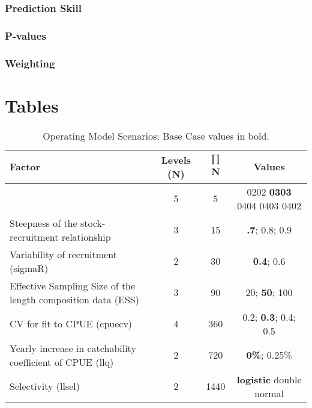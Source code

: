 \documentclass[a4paper]{article}
\begin{document}
\subsubsection*{Prediction Skill}
\subsubsection*{P-values}
\subsubsection*{Weighting}


\newpage


\newpage




\newpage\clearpage



\clearpage
\newpage

\section*{Tables}

\begin{table}[ht]
\label{tab:grid}
\caption{Operating Model Scenarios; Base Case values in bold.}  
\begin{center}
\label{tab:datasumm}
\small

\begin{tabular}{|lccc|}

\hline
Factor & {Levels (N)} & {$\prod$ N} & {Values} \\ %
\hline\hline
{Natural mortality (M)& {5}}  & {  5}  & { 0202  \textbf{0303} 0404 0403 0402}    \\
{Steepness of the stock-recruitment relationship}}& {3} 	 & {15}  & { \textbf{.7}; 0.8; 0.9} \\
{Variability of recruitment (sigmaR)}& {2} 	 & { 30}  & { \textbf{0.4}; 0.6} \\
{Effective Sampling Size of the length composition data (ESS)}& {3} & { 90}  & { 20; \textbf{50}; 100} \\
{CV for fit to CPUE (cpuecv)}& {4} 	 & { 360}  & { 0.2;  \textbf{0.3}; 0.4; 0.5} \\
{Yearly increase in catchability coefficient of CPUE (llq)}& {2} 	 & {  720}  & { \textbf{0\%}; 0.25\%} \\
  {Selectivity (llsel)}& {2}}& {1440}} & { \textbf{logistic} double normal} \\
\hline


\end{tabular}
\end{center}
\end{table}

\end{document}
